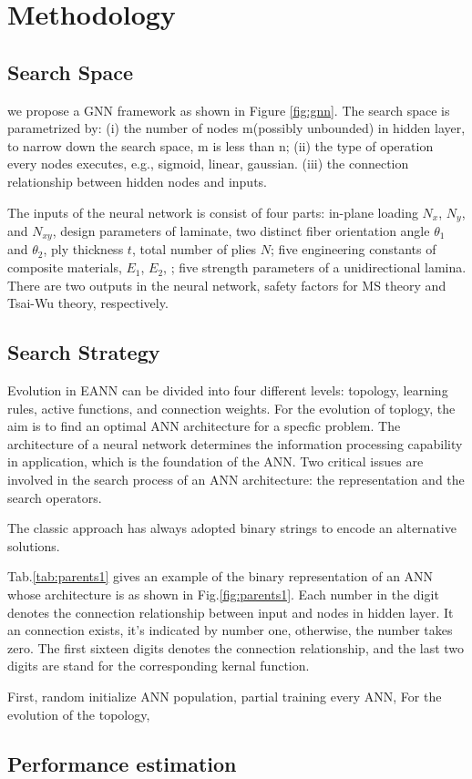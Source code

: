 \section{Methodology}

\subsection{Search Space}
we propose a GNN framework as shown in Figure \ref{fig:gnn}. The search space
is parametrized by: (i) the number of nodes m(possibly unbounded) in hidden
layer, to narrow down the search space, m is less than n; (ii) the type of
operation every nodes executes, e.g., sigmoid, linear, gaussian. (iii) the
connection relationship between hidden nodes and inputs.



The inputs of the neural network is consist of four parts: in-plane loading
$N_x$, $N_y$, and $N_{xy}$, design parameters of laminate, two distinct fiber
orientation angle $\theta_1$ and $\theta_2$, ply thickness $t$, total number of
plies $N$; five engineering constants of composite materials, $E_1$, $E_2$, ;
five strength parameters of a unidirectional lamina. There are two outputs in
the neural network, safety factors for MS theory and Tsai-Wu theory, respectively.
\subsection{Search Strategy}



Evolution in EANN can be divided into four different levels: topology, learning
rules, active functions, and connection weights. For the evolution of toplogy,
the aim is to find an optimal ANN architecture for a specfic problem. The
architecture of a neural network determines the information processing
capability in application, which is the foundation of the ANN. Two critical
issues are involved in the search process of an ANN architecture: the
representation and the search operators.

The classic approach has always adopted binary strings to encode an alternative solutions. 


Tab.\ref{tab:parents1}  gives an example of the binary representation of an ANN
whose architecture is as shown in Fig.\ref{fig:parents1}. Each number in the
digit denotes the connection relationship between input and nodes in hidden
layer. It an connection exists, it's indicated by number one, otherwise, the
number takes zero. The first sixteen digits denotes the connection relationship, and the
last two digits are stand for  the corresponding kernal function. 

First,  random initialize ANN population, partial training every ANN, 
For the evolution of the topology,

\subsection{Performance estimation}








